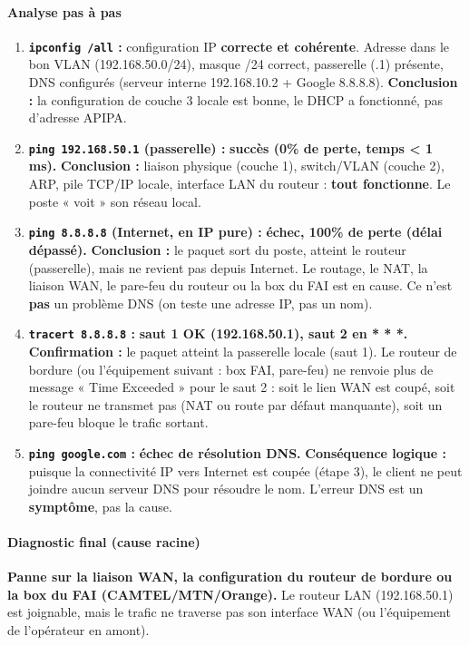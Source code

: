 \documentclass[11pt]{article}
\begin{document}
\begin{exoresolu}
\paragraph{Analyse pas à pas}
\begin{enumerate}
    \item \textbf{\texttt{ipconfig /all} :} configuration IP \textbf{correcte et cohérente}. Adresse dans le bon VLAN (192.168.50.0/24), masque /24 correct, passerelle (.1) présente, DNS configurés (serveur interne 192.168.10.2 + Google 8.8.8.8). \textbf{Conclusion :} la configuration de couche 3 locale est bonne, le DHCP a fonctionné, pas d'adresse APIPA.
    \item \textbf{\texttt{ping 192.168.50.1} (passerelle) :} \textbf{succès (0\% de perte, temps < 1 ms).} \textbf{Conclusion :} liaison physique (couche 1), switch/VLAN (couche 2), ARP, pile TCP/IP locale, interface LAN du routeur : \textbf{tout fonctionne}. Le poste « voit » son réseau local.
    \item \textbf{\texttt{ping 8.8.8.8} (Internet, en IP pure) :} \textbf{échec, 100\% de perte (délai dépassé).} \textbf{Conclusion :} le paquet sort du poste, atteint le routeur (passerelle), mais ne revient pas depuis Internet. Le routage, le NAT, la liaison WAN, le pare-feu du routeur ou la box du FAI est en cause. Ce n'est \textbf{pas} un problème DNS (on teste une adresse IP, pas un nom).
    \item \textbf{\texttt{tracert 8.8.8.8} :} \textbf{saut 1 OK (192.168.50.1), saut 2 en * * *.} \textbf{Confirmation :} le paquet atteint la passerelle locale (saut 1). Le routeur de bordure (ou l'équipement suivant : box FAI, pare-feu) ne renvoie plus de message « Time Exceeded » pour le saut 2 : soit le lien WAN est coupé, soit le routeur ne transmet pas (NAT ou route par défaut manquante), soit un pare-feu bloque le trafic sortant.
    \item \textbf{\texttt{ping google.com} :} \textbf{échec de résolution DNS.} \textbf{Conséquence logique :} puisque la connectivité IP vers Internet est coupée (étape 3), le client ne peut joindre aucun serveur DNS pour résoudre le nom. L'erreur DNS est un \textbf{symptôme}, pas la cause.
\end{enumerate}

\paragraph{Diagnostic final (cause racine)}
\textbf{Panne sur la liaison WAN, la configuration du routeur de bordure ou la box du FAI (CAMTEL/MTN/Orange).} Le routeur LAN (192.168.50.1) est joignable, mais le trafic ne traverse pas son interface WAN (ou l'équipement de l'opérateur en amont).


\end{exoresolu}
\end{document}
